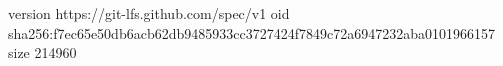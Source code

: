 version https://git-lfs.github.com/spec/v1
oid sha256:f7ec65e50db6acb62db9485933cc3727424f7849c72a6947232aba0101966157
size 214960
